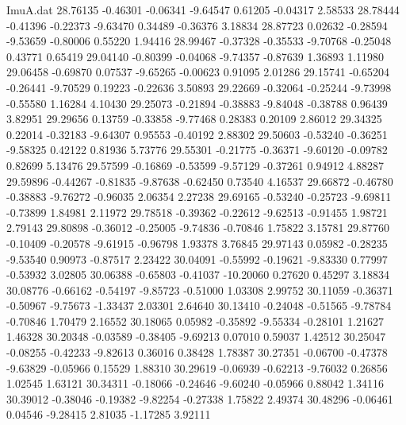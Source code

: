 \begin{filecontents}{ImuA.dat}
  28.76135   -0.46301   -0.06341   -9.64547    0.61205   -0.04317    2.58533
  28.78444   -0.41396   -0.22373   -9.63470    0.34489   -0.36376    3.18834
  28.87723    0.02632   -0.28594   -9.53659   -0.80006    0.55220    1.94416
  28.99467   -0.37328   -0.35533   -9.70768   -0.25048    0.43771    0.65419
  29.04140   -0.80399   -0.04068   -9.74357   -0.87639    1.36893    1.11980
  29.06458   -0.69870    0.07537   -9.65265   -0.00623    0.91095    2.01286
  29.15741   -0.65204   -0.26441   -9.70529    0.19223   -0.22636    3.50893
  29.22669   -0.32064   -0.25244   -9.73998   -0.55580    1.16284    4.10430
  29.25073   -0.21894   -0.38883   -9.84048   -0.38788    0.96439    3.82951
  29.29656    0.13759   -0.33858   -9.77468    0.28383    0.20109    2.86012
  29.34325    0.22014   -0.32183   -9.64307    0.95553   -0.40192    2.88302
  29.50603   -0.53240   -0.36251   -9.58325    0.42122    0.81936    5.73776
  29.55301   -0.21775   -0.36371   -9.60120   -0.09782    0.82699    5.13476
  29.57599   -0.16869   -0.53599   -9.57129   -0.37261    0.94912    4.88287
  29.59896   -0.44267   -0.81835   -9.87638   -0.62450    0.73540    4.16537
  29.66872   -0.46780   -0.38883   -9.76272   -0.96035    2.06354    2.27238
  29.69165   -0.53240   -0.25723   -9.69811   -0.73899    1.84981    2.11972
  29.78518   -0.39362   -0.22612   -9.62513   -0.91455    1.98721    2.79143
  29.80898   -0.36012   -0.25005   -9.74836   -0.70846    1.75822    3.15781
  29.87760   -0.10409   -0.20578   -9.61915   -0.96798    1.93378    3.76845
  29.97143    0.05982   -0.28235   -9.53540    0.90973   -0.87517    2.23422
  30.04091   -0.55992   -0.19621   -9.83330    0.77997   -0.53932    3.02805
  30.06388   -0.65803   -0.41037  -10.20060    0.27620    0.45297    3.18834
  30.08776   -0.66162   -0.54197   -9.85723   -0.51000    1.03308    2.99752
  30.11059   -0.36371   -0.50967   -9.75673   -1.33437    2.03301    2.64640
  30.13410   -0.24048   -0.51565   -9.78784   -0.70846    1.70479    2.16552
  30.18065    0.05982   -0.35892   -9.55334   -0.28101    1.21627    1.46328
  30.20348   -0.03589   -0.38405   -9.69213    0.07010    0.59037    1.42512
  30.25047   -0.08255   -0.42233   -9.82613    0.36016    0.38428    1.78387
  30.27351   -0.06700   -0.47378   -9.63829   -0.05966    0.15529    1.88310
  30.29619   -0.06939   -0.62213   -9.76032    0.26856    1.02545    1.63121
  30.34311   -0.18066   -0.24646   -9.60240   -0.05966    0.88042    1.34116
  30.39012   -0.38046   -0.19382   -9.82254   -0.27338    1.75822    2.49374
  30.48296   -0.06461    0.04546   -9.28415    2.81035   -1.17285    3.92111

\end{filecontents}
